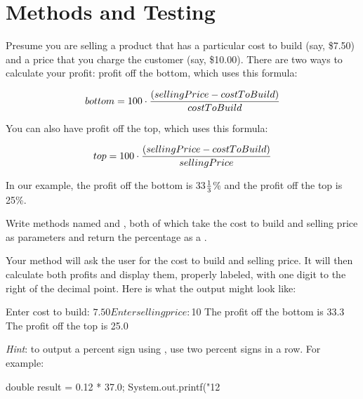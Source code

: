 \chapter{Methods and Testing}

\begin{exercise}
Presume you are selling a product that has a particular cost to build (say, \$7.50) and a price that you charge the customer (say, \$10.00). There are two ways to calculate your profit: profit off the bottom, which uses this formula:

\begin{equation*}
bottom = 100 \cdot {(sellingPrice - costToBuild) \over costToBuild}
\end{equation*}

You can also have profit off the top, which uses this formula:

\begin{equation*}
top = 100 \cdot {(sellingPrice - costToBuild) \over sellingPrice}
\end{equation*}

In our example, the profit off the bottom is 33$1\over 3$\% and the profit off the top is 25\%.

Write methods named  and , both of which take the cost to build and selling price as  parameters and return the percentage as a .

Your  method will ask the user for the cost to build and selling price. It will then calculate both profits and display them, properly labeled, with one digit to the right of the decimal point.
Here is what the output might look like:

\begin{stdout}
Enter cost to build: $7.50
Enter selling price: $10
The profit off the bottom is 33.3%
The profit off the top is 25.0%
\end{stdout}

{\it Hint}: to output a percent sign using , use two percent signs in a row. For example:

\begin{code}
double result = 0.12 * 37.0;
System.out.printf("12%
\end{code}

\end{exercise}

